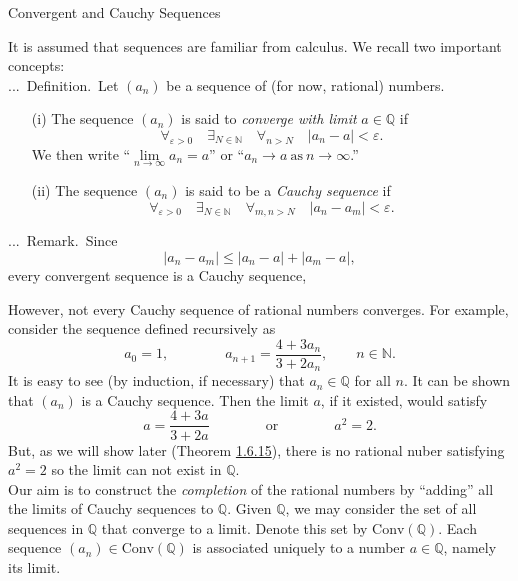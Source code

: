 \documentclass[smaller,hyperref={CJKbookmarks=true}]{beamer}
\newcommand{\N}{\mathbb{N}} \newcommand{\Z}{\mathbb{Z}} \newcommand{\Q}{\mathbb{Q}}
\newcounter{zhuo}[subsection]
\renewcommand{\thezhuo}{\thesection.\thesubsection.\arabic{zhuo}}
\newenvironment{DEFINITION}{\stepcounter{zhuo}\alert{\thezhuo.~Definition.\,}}{}
\newenvironment{REMARK}{\stepcounter{zhuo}\alert{\thezhuo.~Remark.\,}}{}
\begin{document}
\begin{frame}{Convergent and Cauchy Sequences}
\begin{spacing}{0.9}
It is assumed that sequences are familiar from calculus. We recall two
important concepts:\\[4pt]
\begin{DEFINITION}
  Let $(a_n)$ be a sequence of (for now, rational) numbers.
  \begin{itemize}
    \item[(i)] The sequence $(a_n)$ is said to \emph{converge with limit} $a\in\Q$ if
        \[\mathop{\forall}_{\varepsilon>0}\quad
        \mathop{\exists}_{N\in\N}\quad\mathop{\forall}_{n>N}
        \quad|a_n-a|<\varepsilon.\]
        We then write ``$\lim\limits_{n\to\infty}a_n=a$'' or ``$a_n\to a~\text{as}~n\to\infty$.''
    \item[(ii)] The sequence $(a_n)$ is said to be a \emph{Cauchy sequence} if
        \[\mathop{\forall}_{\varepsilon>0}\quad
        \mathop{\exists}_{N\in\N}\quad\mathop{\forall}_{m,n>N}
        \quad|a_n-a_m|<\varepsilon.\]
  \end{itemize}
\end{DEFINITION}
\begin{REMARK}
Since
\[|a_n-a_m|\leq|a_n-a|+|a_m-a|,\]
every convergent sequence is a Cauchy sequence,
\end{REMARK}
\end{spacing}
\newpage
\begin{spacing}{1.05}
However, not every Cauchy sequence of rational numbers converges. For
example, consider the sequence defined recursively as
\[a_0=1,\qquad\qquad a_{n+1}=\frac{4+3a_n}{3+2a_n},\qquad
n\in\N.\]
It is easy to see (by induction, if necessary) that $a_n\in\Q$ for all $n$. It can be shown that $(a_n)$ is a Cauchy sequence. Then the limit $a$, if it existed, would satisfy
\[a=\frac{4+3a}{3+2a}\qquad\qquad
\text{or}\qquad\qquad a^2=2.\]
But, as we will show later (Theorem \hyperlink{1.6.15}{1.6.15}),
there is no rational nuber satisfying $a^2=2$ so the limit can not exist in $\Q$.\\[5pt]
Our aim is to construct the \emph{completion} of the rational numbers by
``adding'' all the limits of Cauchy sequences to $\Q$.
\newpage
Given $\Q$, we may consider the set of all sequences in $\Q$ that converge to a limit. Denote this set by $\text{Conv}(\Q)$. Each sequence $(a_n)\in\text{Conv}(\Q)$ is associated uniquely to a number $a\in\Q$, namely its limit.\\[5pt]

\end{spacing}
\end{frame}
\end{document}
